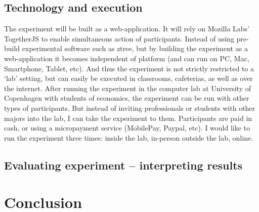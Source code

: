 \documentclass[a4paper,12pt]{article}
\begin{document}
	\subsection{Technology and execution}
	The experiment will be built as a web-application. It will rely on Mozilla Labs' TogetherJS to enable simultaneous action of participants. Instead of using pre-build experimental software such as ztree, but by building the experiment as a web-application it becomes independent of platform (and can run on PC, Mac, Smartphone, Tablet, etc). And thus the experiment is not strictly restricted to a `lab' setting, but can easily be executed in classrooms, cafeterias, as well as over the internet. After running the experiment in the computer lab at University of Copenhagen with students of economics, the experiment can be run with other types of participants. But instead of inviting professionals or students with other majors into the lab, I can take the experiment to them. Participants are paid in cash, or using a micropayment service (MobilePay, Paypal, etc). I would like to run the experiment three times: inside the lab, in-person outside the lab, online.


	\subsection{Evaluating experiment -- interpreting results}
	
	\section{Conclusion}
			
	\newpage
	


	\nocite{*}
%
%

	\appendix
	
\end{document}
